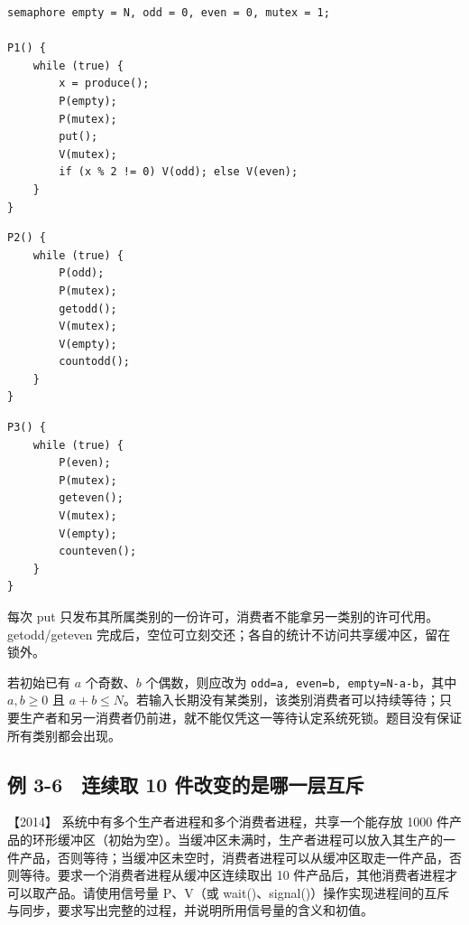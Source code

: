 \par\medskip\noindent
\begin{minipage}{\linewidth}
\begin{verbatim}
semaphore empty = N, odd = 0, even = 0, mutex = 1;

P1() {
    while (true) {
        x = produce();
        P(empty);
        P(mutex);
        put();
        V(mutex);
        if (x % 2 != 0) V(odd); else V(even);
    }
}
\end{verbatim}
\end{minipage}\par\medskip

\par\medskip\noindent
\begin{minipage}{\linewidth}
\begin{verbatim}
P2() {
    while (true) {
        P(odd);
        P(mutex);
        getodd();
        V(mutex);
        V(empty);
        countodd();
    }
}
\end{verbatim}
\end{minipage}\par\medskip

\par\medskip\noindent
\begin{minipage}{\linewidth}
\begin{verbatim}
P3() {
    while (true) {
        P(even);
        P(mutex);
        geteven();
        V(mutex);
        V(empty);
        counteven();
    }
}
\end{verbatim}
\end{minipage}\par\medskip

每次 put 只发布其所属类别的一份许可，消费者不能拿另一类别的许可代用。getodd/geteven 完成后，空位可立刻交还；各自的统计不访问共享缓冲区，留在锁外。

若初始已有 \(a\) 个奇数、\(b\) 个偶数，则应改为 \allowbreak{}\texttt{odd=a,}\allowbreak{}\texttt{\ even=b,}\allowbreak{}\texttt{\ empty=N-a-b}，其中 \(a,b\ge0\) 且 \(a+b\le N\)。若输入长期没有某类别，该类别消费者可以持续等待；只要生产者和另一消费者仍前进，就不能仅凭这一等待认定系统死锁。题目没有保证所有类别都会出现。

\subsection{例 3-6　连续取 10 件改变的是哪一层互斥}\label{ex-2014}

\noindent{}【2014】 系统中有多个生产者进程和多个消费者进程，共享一个能存放 1000 件产品的环形缓冲区（初始为空）。当缓冲区未满时，生产者进程可以放入其生产的一件产品，否则等待；当缓冲区未空时，消费者进程可以从缓冲区取走一件产品，否则等待。要求一个消费者进程从缓冲区连续取出 10 件产品后，其他消费者进程才可以取产品。请使用信号量 P、V（或 wait()、signal()）操作实现进程间的互斥与同步，要求写出完整的过程，并说明所用信号量的含义和初值。

